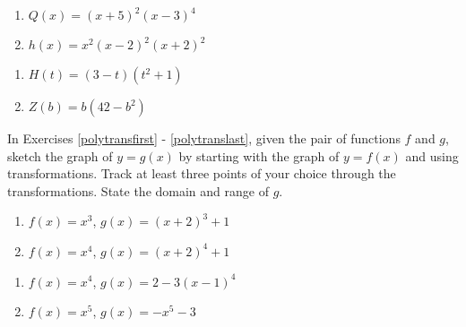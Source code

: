 \documentclass{ximera}
\begin{document}
\begin{multicols}{2}
\begin{enumerate}
\setcounter{enumi}{\value{HW}}

\item $Q(x) = (x + 5)^{2}(x - 3)^{4}$
\item $h(x) = x^2(x-2)^2(x+2)^2$

\setcounter{HW}{\value{enumi}}
\end{enumerate}
\end{multicols}


\begin{multicols}{2}
\begin{enumerate}
\setcounter{enumi}{\value{HW}}

\item $H(t) = (3-t)(t^2+1)$
\item $Z(b) = b(42 - b^{2})$ \label{zeromultgraphlast}

\setcounter{HW}{\value{enumi}}
\end{enumerate}
\end{multicols}




In Exercises \ref{polytransfirst} - \ref{polytranslast}, given the pair of functions $f$ and $g$, sketch the graph of $y=g(x)$ by starting with the graph of $y = f(x)$ and using transformations.  Track at least three points of your choice through the transformations. State the domain and range of $g$.

\begin{multicols}{2}
\begin{enumerate}
\setcounter{enumi}{\value{HW}}

\item $f(x) = x^3$,  $g(x) = (x + 2)^{3} + 1$ \label{polytransfirst}
\item $f(x) = x^4$, $g(x) = (x + 2)^{4} + 1$

\setcounter{HW}{\value{enumi}}
\end{enumerate}
\end{multicols}

\begin{multicols}{2}
\begin{enumerate}
\setcounter{enumi}{\value{HW}}

\item $f(x) = x^4$, $g(x) = 2 - 3(x - 1)^{4}$
\item $f(x) = x^5$, $g(x) = -x^{5} - 3$

\setcounter{HW}{\value{enumi}}
\end{enumerate}
\end{multicols}
\end{document}
